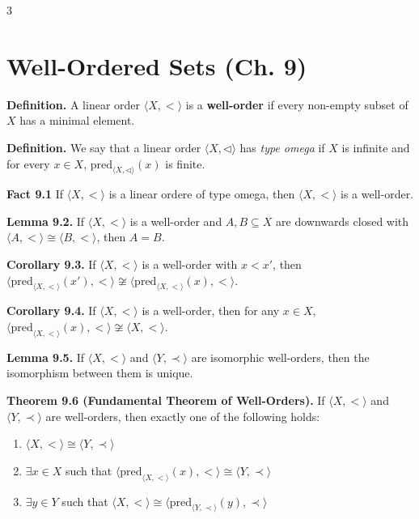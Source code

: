 \documentclass[landscape,8pt]{article}
\begin{document}
\begin{multicols}{3}
	\small

	\section*{\centering Well-Ordered Sets (Ch. 9)}

	\noindent\textbf{Definition.} A linear order $\langle X, < \rangle$ is a \textbf{well-order} if every non-empty subset of $X$ has a minimal element.

	\noindent\textbf{Definition.} We say that a linear order $\langle X,  \triangleleft\rangle$ has \textit{type omega} if $X$ is infinite and for every $x \in X$, $\textrm{pred}_{\langle X, \triangleleft\rangle}(x)$ is finite.

	\noindent\textbf{Fact 9.1} If $\langle X, <\rangle$ is a linear ordere of type omega, then $\langle X, <\rangle$ is a well-order.

	\noindent\textbf{Lemma 9.2.} If $\langle X, < \rangle$ is a well-order and $A, B \subseteq X$ are downwards closed with $\langle A, < \rangle \cong \langle B, < \rangle$, then $A = B$.

	\noindent\textbf{Corollary 9.3.} If $\langle X, < \rangle$ is a well-order with $x < x'$, then $\langle \text{pred}_{\langle X, < \rangle}(x'), < \rangle \not\cong \langle \text{pred}_{\langle X, < \rangle}(x), < \rangle$.

	\noindent\textbf{Corollary 9.4.} If $\langle X, < \rangle$ is a well-order, then for any $x \in X$, $\langle \text{pred}_{\langle X, < \rangle}(x), < \rangle \not\cong \langle X, < \rangle$.

	\noindent\textbf{Lemma 9.5.} If $\langle X, < \rangle$ and $\langle Y, \prec \rangle$ are isomorphic well-orders, then the isomorphism between them is unique.

	\noindent\textbf{Theorem 9.6 (Fundamental Theorem of Well-Orders).} If $\langle X, < \rangle$ and $\langle Y, \prec \rangle$ are well-orders, then exactly one of the following holds:
	\begin{enumerate}[noitemsep,topsep=0pt]
		\item $\langle X, < \rangle \cong \langle Y, \prec \rangle$
		\item $\exists x \in X$ such that $\langle \text{pred}_{\langle X, < \rangle}(x), < \rangle \cong \langle Y, \prec \rangle$
		\item $\exists y \in Y$ such that $\langle X, < \rangle \cong \langle \text{pred}_{\langle Y, \prec \rangle}(y), \prec \rangle$
	\end{enumerate}


\end{multicols}
\end{document}
